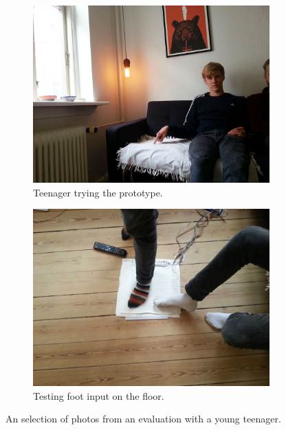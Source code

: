 \begin{figure}[t]
    \begin{subfigure}[t]{0.44\textwidth}
        \centering
        \includegraphics[width=\textwidth]{figures/touch/evaluation/sebastian/sofa_infront_seb}
        \caption{Teenager trying the prototype.}
        \label{fig:textiletouch:eval:sebastian:sofa_front}
    \end{subfigure}%
    \hspace{0.02\textwidth}
    \begin{subfigure}[t]{0.44\textwidth}
        \centering
        \includegraphics[width=\textwidth]{figures/touch/evaluation/sebastian/feet}
        \caption{Testing foot input on the floor.}
        \label{fig:textiletouch:eval:sebastian:feet}
    \end{subfigure}
    \caption{An selection of photos from an evaluation with a young teenager.}
    \label{fig:textiletouch:eval:sebastian}
\end{figure}

